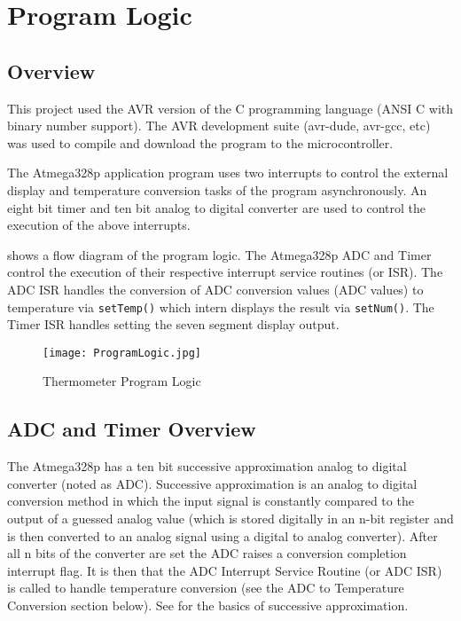 \documentclass[main.tex]{subfiles}
\begin{document}
\chapter{Program Logic} 
	\section{Overview}
	This project used the AVR version of the C programming language (ANSI C with
	binary number support). The AVR development suite (avr-dude, avr-gcc, etc) was
	used to compile and download the program to the microcontroller. 
	
	The Atmega328p application program uses two interrupts to control the external
	display and temperature conversion tasks of the program asynchronously. An
	eight bit timer and ten bit analog to digital converter are used to control
	the execution of the above interrupts. 
	
	 shows a flow diagram of the program logic. The Atmega328p
	ADC and Timer control the execution of their respective interrupt service
	routines (or ISR). The ADC ISR handles the conversion of ADC conversion values
	(ADC values) to temperature via \lstinline{setTemp()} which intern displays
	the result via \lstinline{setNum()}. The Timer ISR handles setting the seven
	segment display output.
	
	\begin{figure}[H]
		\begin{center}
			\texttt{[image: ProgramLogic.jpg]}
		\end{center}
		\caption{Thermometer Program Logic}
		\label{fig:progLogic}
	\end{figure}

	\section{ADC and Timer Overview}
	The Atmega328p has a ten bit successive approximation analog to digital
	converter (noted as ADC). Successive approximation is an analog to digital
	conversion method in which the input signal is constantly compared to the
	output of a guessed analog value (which is stored digitally in an n-bit
	register and is then converted to an analog signal using a digital to analog
	converter). After all n bits of the converter are set the ADC raises a
	conversion completion interrupt flag. It is then that the ADC Interrupt
	Service Routine (or ADC ISR) is called to handle temperature conversion (see
	the ADC to Temperature Conversion section below). See  for the
	basics of successive approximation.
\end{document}
